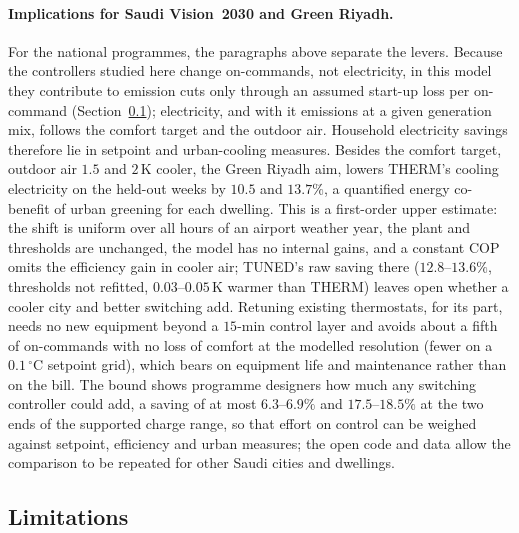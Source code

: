 \documentclass[pdflatex,sn-mathphys-num,iicol]{sn-jnl}
\theoremstyle{thmstyleone}\newtheorem{proposition}{Proposition}\newtheorem{corollary}{Corollary}
\theoremstyle{thmstyletwo}\newtheorem{remark}{Remark}\newtheorem{observation}{Observation}
\theoremstyle{thmstylethree}\newtheorem{definition}{Definition}
\begin{document}
\paragraph{Implications for Saudi Vision~2030 and Green Riyadh.}
For the national programmes, the paragraphs above separate the levers. Because the controllers studied here change on-commands, not electricity, in this model they contribute to emission cuts only through an assumed start-up loss per on-command (Section~\ref{subsec:limits}); electricity, and with it emissions at a given generation mix, follows the comfort target and the outdoor air. Household electricity savings therefore lie in setpoint and urban-cooling measures. Besides the comfort target, outdoor air $1.5$ and $2\,$K cooler, the Green Riyadh aim, lowers THERM's cooling electricity on the held-out weeks by $10.5$ and $13.7\%$, a quantified energy co-benefit of urban greening for each dwelling. This is a first-order upper estimate: the shift is uniform over all hours of an airport weather year, the plant and thresholds are unchanged, the model has no internal gains, and a constant COP omits the efficiency gain in cooler air; TUNED's raw saving there ($12.8$--$13.6\%$, thresholds not refitted, $0.03$--$0.05\,$K warmer than THERM) leaves open whether a cooler city and better switching add. Retuning existing thermostats, for its part, needs no new equipment beyond a $15$-min control layer and avoids about a fifth of on-commands with no loss of comfort at the modelled resolution (fewer on a $0.1\,^\circ$C setpoint grid), which bears on equipment life and maintenance rather than on the bill. The bound shows programme designers how much any switching controller could add, a saving of at most $6.3$--$6.9\%$ and $17.5$--$18.5\%$ at the two ends of the supported charge range, so that effort on control can be weighed against setpoint, efficiency and urban measures; the open code and data allow the comparison to be repeated for other Saudi cities and dwellings.

\subsection{Limitations}
\label{subsec:limits}
\label{subsec:disc_limits}
\end{document}
